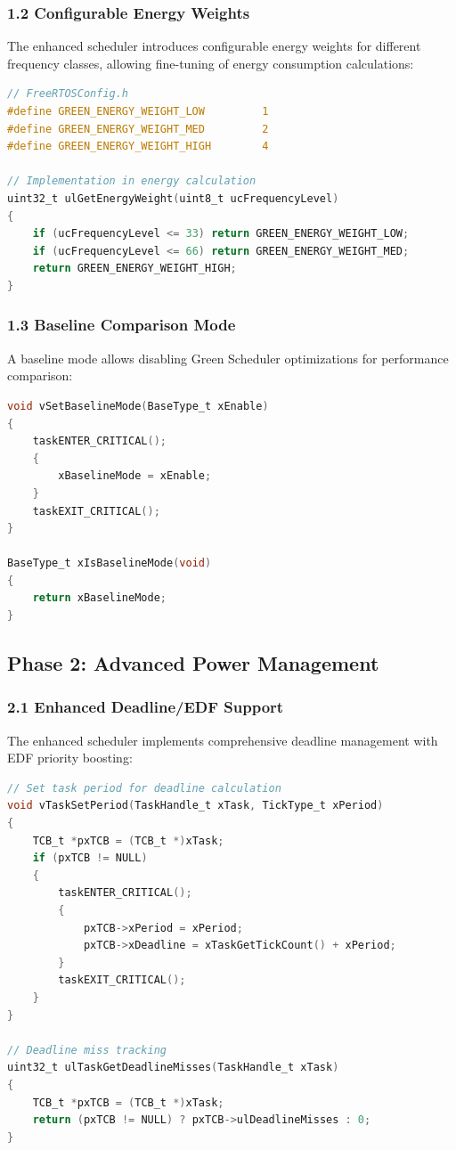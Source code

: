 \documentclass[11pt,a4paper]{article}
\begin{document}
\subsubsection{1.2 Configurable Energy Weights}
The enhanced scheduler introduces configurable energy weights for different frequency classes, allowing fine-tuning of energy consumption calculations:

\begin{lstlisting}[language=C, caption=Configurable Energy Weights]
// FreeRTOSConfig.h
#define GREEN_ENERGY_WEIGHT_LOW         1
#define GREEN_ENERGY_WEIGHT_MED         2  
#define GREEN_ENERGY_WEIGHT_HIGH        4

// Implementation in energy calculation
uint32_t ulGetEnergyWeight(uint8_t ucFrequencyLevel)
{
    if (ucFrequencyLevel <= 33) return GREEN_ENERGY_WEIGHT_LOW;
    if (ucFrequencyLevel <= 66) return GREEN_ENERGY_WEIGHT_MED;
    return GREEN_ENERGY_WEIGHT_HIGH;
}
\end{lstlisting}

\subsubsection{1.3 Baseline Comparison Mode}
A baseline mode allows disabling Green Scheduler optimizations for performance comparison:

\begin{lstlisting}[language=C, caption=Baseline Comparison Mode]
void vSetBaselineMode(BaseType_t xEnable)
{
    taskENTER_CRITICAL();
    {
        xBaselineMode = xEnable;
    }
    taskEXIT_CRITICAL();
}

BaseType_t xIsBaselineMode(void)
{
    return xBaselineMode;
}
\end{lstlisting}

\subsection{Phase 2: Advanced Power Management}

\subsubsection{2.1 Enhanced Deadline/EDF Support}
The enhanced scheduler implements comprehensive deadline management with EDF priority boosting:

\begin{lstlisting}[language=C, caption=Deadline Management Implementation]
// Set task period for deadline calculation
void vTaskSetPeriod(TaskHandle_t xTask, TickType_t xPeriod)
{
    TCB_t *pxTCB = (TCB_t *)xTask;
    if (pxTCB != NULL)
    {
        taskENTER_CRITICAL();
        {
            pxTCB->xPeriod = xPeriod;
            pxTCB->xDeadline = xTaskGetTickCount() + xPeriod;
        }
        taskEXIT_CRITICAL();
    }
}

// Deadline miss tracking
uint32_t ulTaskGetDeadlineMisses(TaskHandle_t xTask)
{
    TCB_t *pxTCB = (TCB_t *)xTask;
    return (pxTCB != NULL) ? pxTCB->ulDeadlineMisses : 0;
}
\end{lstlisting}
\end{document}
